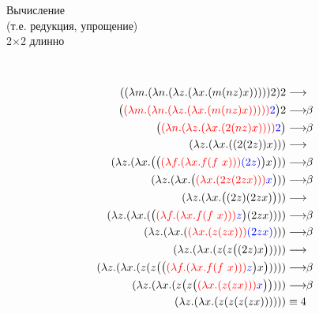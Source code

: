 \begin{frame}[plain]{Вычисление \\(т.е. редукция, упрощение) \\2$\times$2 длинно}
\def\betaarr{\longrightarrow\!\!\beta}
\def\numTWO{\ensuremath{\lam{f}{\lam{x}{f(f\ x)}}}}
\setcounter{equation}{0}
\begin{figure}[t]
  \begin{subfigure}[t]{0.35\textwidth}
  $\qquad$
  \end{subfigure}
  \begin{subfigure}[t]{0.55\textwidth}
        \vspace{-8em}

        {  \begin{align}
          \apppl{\app{\lam{m}{\lam{n}{\lam{z}{\lam{x}{(m \app{n}{z} x)}}}}}{2}}{2} & \longrightarrow \\
          \Apppl{\Redex{\lam{m}{\lam{n}{\lam{z}{\lam{x}{(m \app{n}{z} x)}}}}}{2}}{2} & \betaarr \\
          \Redex{\lam{n}{\lam{z}{\lam{x}{(2 \app{n}{z} x)}}}}{2} & \betaarr \\
          \lam{z}{\lam{x}{\app{\app{2}{\app{2}{z}}}{x}}} & \longrightarrow \\
          \lam{z}{\lam{x}{\App{\Redex{\numTWO}{\app{2}{z}}}{x}}} & \betaarr \\
          \lam{z}{\lam{x}{\Redex{\lam{x}{(2 z (2 z x))}}{x}}} & \betaarr \\
          \lam{z}{\lam{x}{\App{\app{2}{z}}{(2 z x)}}} & \longrightarrow \\
          \lam{z}{\lam{x}{\app{\Redex{\numTWO}{z}}{(2 z x)}}} & \betaarr \\
          \lam{z}{\lam{x}{\redex{\lam{x}{\app{z}{\app{z}{x}}}}{(2 z x)}}} & \betaarr \\
          \lam{z}{\lam{x}{\app{z}{\app{z}{\App{\app{2}{z}}{x}}}}} & \longrightarrow \\
          \lam{z}{\lam{x}{\app{z}{\app{z}{\App{\Redex{\numTWO}{z}}{x}}}}} & \betaarr \\
          \lam{z}{\lam{x}{\app{z}{\App{z}{\Redex{\lam{x}{\app{z}{\app{z}{x}}}}{x}}}}} & \betaarr \\
          \lam{z}{\lam{x}{\app{z}{\app{z}{\app{z}{\app{z}{x}}}}}} & \equiv 4
        \end{align}}
  \end{subfigure}
\end{figure}

\end{frame}

